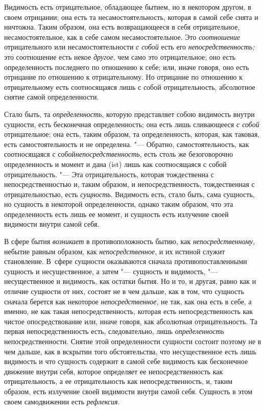 Видимость есть отрицательное, обладающее бытием, но в некотором другом, в
своем отрицании; она есть та несамостоятельность, которая в самой себе
снята и ничтожна. Таким образом, она есть возвращающееся в себя
отрицательное, несамостоятельное, как в себе самом несамостоятельное. Это
{\em соотношение} отрицательного или
несамостоятельности {\em с собой} есть его
{\em непосредственность;} это соотношение есть некое
{\em другое}, чем само это отрицательное; оно есть
определенность последнего по отношению к себе; или, иначе говоря, оно есть
отрицание по отношению к отрицательному. Но отрицание по отношению к
отрицательному есть соотносящаяся лишь с собой отрицательность, абсолютное
снятие самой определенности.

Стало быть, та {\em определенность}, которую
представляет собою видимость внутри сущности, есть бесконечная
определенность; она есть лишь сливающееся {\em с собой}
отрицательное; она есть, таким образом, та определенность, которая, как
таковая, есть самостоятельность и не определена. "--- Обратно,
самостоятельность, как соотносящаяся с собой{\em непосредственность},
есть столь же безоговорочно определенность и момент и
дана (ist) лишь как соотносящаяся с собой отрицательность. "--- Эта
отрицательность, которая тождественна с непосредственностью и, таким
образом, и непосредственность, тождественная с отрицательностью, есть
{\em сущность}. Видимость есть, стало быть, сама
сущность, но сущность в некоторой определенности, однако таким образом, что
эта определенность есть лишь ее момент, и сущность есть излучение своей
видимости внутри самой себя.

В сфере бытия {\em возникает} в противоположность бытию,
как {\em непосредственному}, небытие равным образом,
как {\em непосредственное}, и их истиной служит становление. В~сфере
сущности оказываются сначала противопоставленными сущность и несущественное,
а затем "--- сущность и видимость, "--- несущественное
и видимость, как остатки бытия. Но и то, и другая, равно как и отличие
сущности от них, состоят не в чем дальше, как в том, что сущность сначала
берется как некоторое {\em непосредственное}, не так,
как она есть в себе, а именно, не как такая непосредственность, которая
есть непосредственность как чистое опосредствование или, иначе говоря, как
абсолютная отрицательность. Та первая непосредственность есть,
следовательно, лишь {\em определенность}
непосредственности. Снятие этой определенности сущности состоит поэтому не
в чем дальше, как в вскрытии того обстоятельства, что несущественное есть
лишь видимость и что сущность содержит в самой себе видимость как
бесконечное движение внутри себя, которое определяет ее непосредственность
как отрицательность, а ее отрицательность как непосредственность, и, таким
образом, есть излучение своей видимости внутри самой себя. Сущность в этом
своем самодвижении есть {\em рефлексия}.

